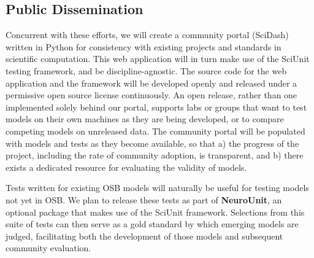 \documentclass[a4paper,12pt]{article}
\begin{document}
\subsection{Public Dissemination}
Concurrent with these efforts, we will create a community portal (SciDash) written in Python for consistency with existing projects and standards in scientific computation.  This web application will in turn make use of the SciUnit testing framework, and be discipline-agnostic.  The source code for the web application and the framework will be developed openly and released under a permissive open source license continuously. An open release, rather than one implemented solely behind our portal, supports labs or groups that want to test models on their own machines as they are being developed, or to compare competing models on unreleased data.  The community portal will be populated with models and tests as they become available, so that a) the progress of the project, including the rate of community adoption, is transparent, and b) there exists a dedicated resource for evaluating the validity of models.  

Tests written for existing OSB models will naturally be useful for testing models not yet in OSB.  We plan to release these tests as part of \textbf{NeuroUnit}, an optional package that makes use of the SciUnit framework.  Selections from this suite of tests can then serve as a gold standard by which emerging models are judged, facilitating both the development of those models and subsequent community evaluation.  
\end{document}
